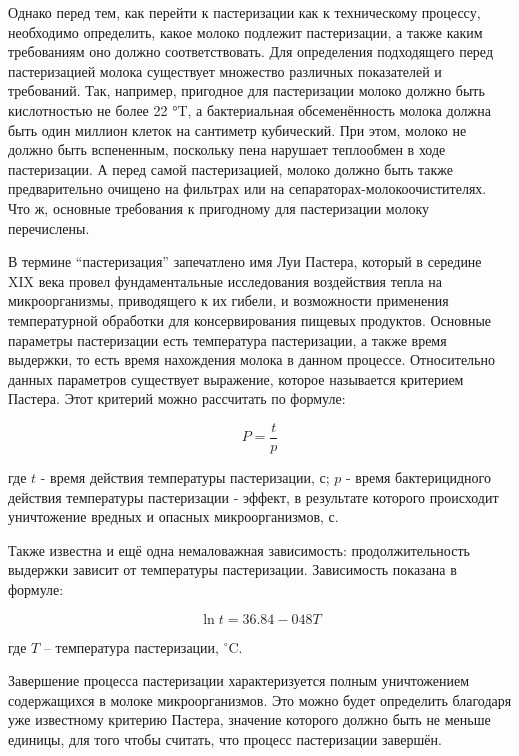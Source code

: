 Однако перед тем, как перейти к пастеризации как к техническому процессу, необходимо определить, какое молоко подлежит пастеризации, а также каким требованиям оно должно соответствовать. Для определения подходящего перед пастеризацией молока существует множество различных показателей и требований. Так, например, пригодное для пастеризации молоко должно быть кислотностью не более 22 °T, а бактериальная обсеменённость молока должна быть один миллион клеток на сантиметр кубический. При этом, молоко не должно быть вспененным, поскольку пена нарушает теплообмен в ходе пастеризации. А перед самой пастеризацией, молоко должно быть также предварительно очищено на фильтрах или на сепараторах-молокоочистителях. Что ж, основные требования к пригодному для пастеризации молоку перечислены.

В термине “пастеризация” запечатлено имя Луи Пастера, который в середине XIX века провел фундаментальные исследования воздействия тепла на микроорганизмы, приводящего к их гибели, и возможности применения температурной обработки для консервирования пищевых продуктов. Основные параметры пастеризации есть температура пастеризации, а также время выдержки, то есть время нахождения молока в данном процессе. Относительно данных параметров существует выражение, которое называется критерием Пастера. Этот критерий можно рассчитать по формуле: 

\begin{equation}
    P=\frac{t}{p}
\end{equation}

где $t$ - время действия температуры пастеризации, с; $p$ - время бактерицидного действия температуры пастеризации - эффект, в результате которого происходит уничтожение вредных и опасных микроорганизмов, с.

Также известна и ещё одна немаловажная зависимость: продолжительность выдержки зависит от температуры пастеризации. Зависимость показана в формуле:

\begin{equation}
    \ln{t} = 36.84 - 048T
\end{equation}

где $T$ {--} температура пастеризации, $^{\circ}$C.

Завершение процесса пастеризации характеризуется полным уничтожением содержащихся в молоке микроорганизмов. Это можно будет определить благодаря уже известному критерию Пастера, значение которого должно быть не меньше единицы, для того чтобы считать, что процесс пастеризации завершён.

